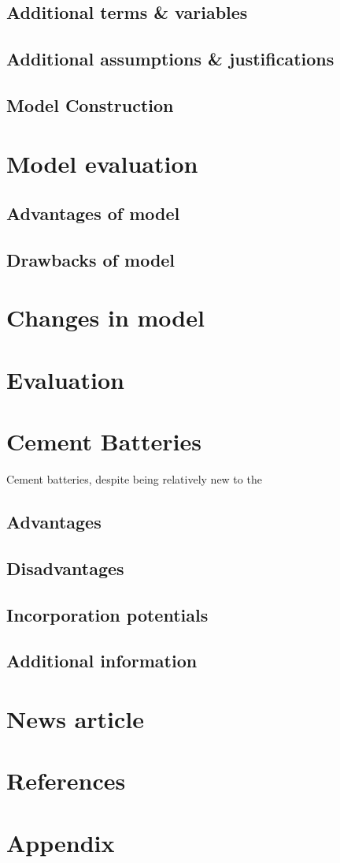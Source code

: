 \documentclass[12pt]{article}
\begin{document}
\subsection{Additional terms \& variables}

\subsection{Additional assumptions \& justifications}

\subsection{Model Construction}


\section{Model evaluation}
\subsection{Advantages of model}

\subsection{Drawbacks of model}


\section{Changes in model}

\section{Evaluation}


\section{Cement Batteries}
Cement batteries, despite being relatively new to the 
\subsection{Advantages}

\subsection{Disadvantages}

\subsection{Incorporation potentials}

\subsection{Additional information}



\section{News article}
\newpage


\pagestyle{fancy}
\newpage
\section{References}


\section{Appendix}
\end{document}
